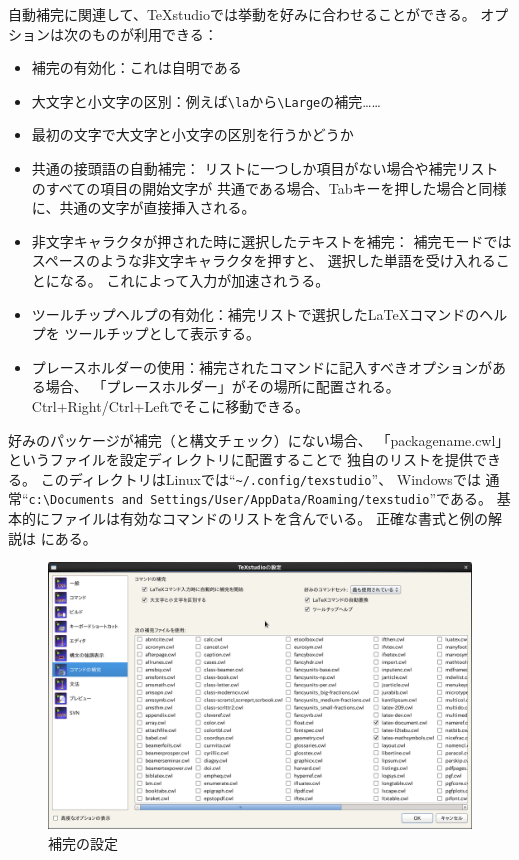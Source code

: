 自動補完に関連して、TeXstudioでは挙動を好みに合わせることができる。
オプションは次のものが利用できる：

\begin{itemize}
\item
  補完の有効化：これは自明である
\item
  大文字と小文字の区別：例えば\verb+\la+から\verb+\Large+の補完……
\item
  最初の文字で大文字と小文字の区別を行うかどうか
\item
  共通の接頭語の自動補完：
  リストに一つしか項目がない場合や補完リストのすべての項目の開始文字が
  共通である場合、Tabキーを押した場合と同様に、共通の文字が直接挿入される。
\item
  非文字キャラクタが押された時に選択したテキストを補完：
  補完モードではスペースのような非文字キャラクタを押すと、
  選択した単語を受け入れることになる。
  これによって入力が加速されうる。
\item
  ツールチップヘルプの有効化：補完リストで選択したLaTeXコマンドのヘルプを
  ツールチップとして表示する。
\item
  プレースホルダーの使用：補完されたコマンドに記入すべきオプションがある場合、
  「プレースホルダー」がその場所に配置される。
  Ctrl+Right/Ctrl+Leftでそこに移動できる。
\end{itemize}

好みのパッケージが補完（と構文チェック）にない場合、
「packagename.cwl」というファイルを設定ディレクトリに配置することで
独自のリストを提供できる。
このディレクトリはLinuxでは``\verb+~/.config/texstudio+''、
Windowsでは
通常``\verb+c:\Documents and Settings/User/AppData/Roaming/texstudio+''である。
基本的にファイルは有効なコマンドのリストを含んでいる。
正確な書式と例の解説は
にある。

\begin{figure}[H]
  \centering
  \includegraphics[width=.8\linewidth]{configure_completion.png}
  \caption{補完の設定}
\end{figure}

